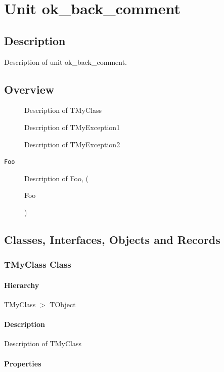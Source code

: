 \documentclass{report}
\begin{document}
\newlength{\tmplength}
\chapter{Unit ok{\_}back{\_}comment}
\section{Description}
Description of unit ok{\_}back{\_}comment.
\section{Overview}
\begin{description}
\item[\texttt{\begin{ttfamily}TMyClass\end{ttfamily} Class}]Description of TMyClass
\item[\texttt{\begin{ttfamily}TMyException1\end{ttfamily} Class}]Description of TMyException1
\item[\texttt{\begin{ttfamily}TMyException2\end{ttfamily} Class}]Description of TMyException2
\end{description}
\begin{description}
\item[\texttt{Foo}]Description of Foo, (\begin{ttfamily}Foo\end{ttfamily})
\end{description}
\section{Classes, Interfaces, Objects and Records}
\subsection*{TMyClass Class}
\subsubsection*{\large{\textbf{Hierarchy}}\normalsize\hspace{1ex}\hfill}
TMyClass {$>$} TObject
\subsubsection*{\large{\textbf{Description}}\normalsize\hspace{1ex}\hfill}
Description of TMyClass\subsubsection*{\large{\textbf{Properties}}\normalsize\hspace{1ex}\hfill}
\end{document}
